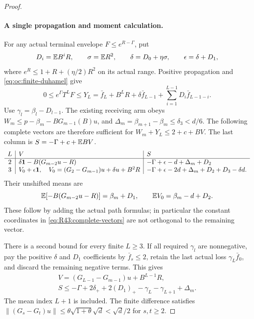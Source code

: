 \begin{proof}
\paragraph{A single propagation and moment calculation.}
\label{part:R43:engine}
For any actual terminal envelope \(F\le e^{R-\Gamma}\), put
\[
 D_i=\mathbb E B^iR,\qquad \sigma=\mathbb E R^2,\qquad
 \delta=D_0+\eta\sigma,\qquad \epsilon=\delta+D_1,
\]
where \(e^R\le1+R+(\eta/2)R^2\) on its actual range.
Positive propagation and \eqref{eq:oc:finite-duhamel} give
\begin{equation}\label{eq:R43:propagation}
 0\le e^\Gamma T^LF\le Y_L
 =\bar f_L+B^LR+\delta\bar f_{L-1}
           +\sum_{i=1}^{L-1}D_i\bar f_{L-1-i}.
\end{equation}
Use \(\gamma_l=\beta_l-D_{l-1}\). The existing receiving arm obeys
\(W_m\le p-\beta_m-BG_{m-1}(B)u\), and
\(\Delta_m=\beta_{m+1}-\beta_m\le\delta_3<d/6\).
The following complete vectors are therefore sufficient for
\(W_m+Y_L\le2+c+BV\). The last column is
\(S=-\Gamma+c+\mathbb E BV\).
\begin{equation}\label{eq:R43:complete-vectors}
\begin{array}{c|l|l}
L&V&S\\\hline
2&\delta\mathbf1-B(G_{m-2}u-R)
 &-\Gamma+\epsilon-d+\Delta_m+D_2\\
3&V_0+\epsilon\mathbf1,\quad
 V_0=(G_2-G_{m-1})u+\delta u+B^2R
 &-\Gamma+\epsilon-2d+\Delta_m+D_2+D_3-\delta d.
\end{array}
\end{equation}
Their unshifted means are
\begin{equation}\label{eq:R43:vector-means}
 \mathbb E[-B(G_{m-2}u-R)]=\beta_m+D_1,
 \qquad \mathbb E V_0=\beta_m-d+D_2.
\end{equation}
These follow by adding the actual path formulas; in particular the
constant coordinates in \eqref{eq:R43:complete-vectors} are not
orthogonal to the remaining vector.

There is a second bound for every finite \(L\ge3\). If all required
\(\gamma_l\) are nonnegative, pay the positive \(\delta\) and
\(D_1\) coefficients by \(\bar f_s\le2\), retain the last actual
loss \(\gamma_L\bar f_0\), and discard the remaining negative terms.
This gives
\begin{equation}\label{eq:R43:finite-tail}
 \begin{gathered}
 V=(G_{L-1}-G_{m-1})u+B^{L-1}R,\\
 S\le-\Gamma+2\delta_++2(D_1)_+
               -\gamma_L-\gamma_{L+1}+\Delta_m.
 \end{gathered}
\end{equation}
The mean index \(L+1\) is included. The finite difference satisfies
\(\|(G_s-G_t)u\|\le\theta\sqrt{1+\theta}\sqrt d<\sqrt d/2\)
for \(s,t\ge2\).


\end{proof}

